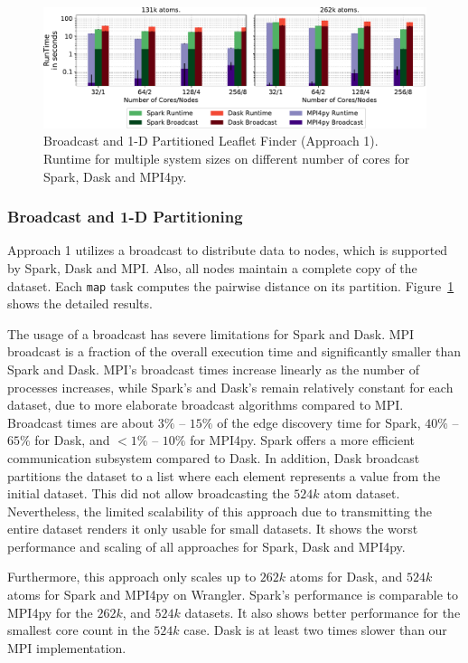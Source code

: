 \begin{figure}[t]
    \centering
    \includegraphics[width=.75\textwidth]{figures/data_analytics_hpc/task_par/spark_dask_lf_approach1.pdf}
    \caption{Broadcast and 1-D Partitioned Leaflet Finder (Approach 1).
    Runtime for multiple system sizes on different number of cores for Spark, Dask and MPI4py.}
    \label{fig:WranglerLeafLetFinderApp1}
\end{figure}

\subsubsection*{Broadcast and 1-D Partitioning}
Approach 1 utilizes a broadcast to distribute data to nodes, which is supported by Spark, Dask and MPI.
Also, all nodes maintain a complete copy of the dataset.
Each \texttt{map} task computes the pairwise distance on its partition.
Figure~\ref{fig:WranglerLeafLetFinderApp1} shows the detailed results.

The usage of a broadcast has severe limitations for Spark and Dask.
MPI broadcast is a fraction of the overall execution time and significantly smaller than Spark and Dask.
MPI's broadcast times increase linearly as the number of processes increases, while Spark's and Dask's remain relatively constant for each dataset, due to more elaborate broadcast algorithms compared to MPI.
Broadcast times are about $3\%$ -- $15\%$ of the edge discovery time for Spark, $40\%$ -- $65\%$ for Dask, and $<1\%$ -- $10\%$ for MPI4py.
Spark offers a more efficient communication subsystem compared to Dask.
In addition, Dask broadcast partitions the dataset to a list where each element represents a value from the initial dataset.
This did not allow broadcasting the $524k$ atom dataset.
Nevertheless, the limited scalability of this approach due to transmitting the entire dataset renders it only usable for small datasets.
It shows the worst performance and scaling of all approaches for Spark, Dask and MPI4py.

Furthermore, this approach only scales up to $262k$ atoms for Dask, and $524k$ atoms for Spark and MPI4py on Wrangler.
Spark's performance is comparable to MPI4py for the $262k$, and $524k$ datasets.
It also shows better performance for the smallest core count in the $524k$ case.
Dask is at least two times slower than our MPI implementation.

